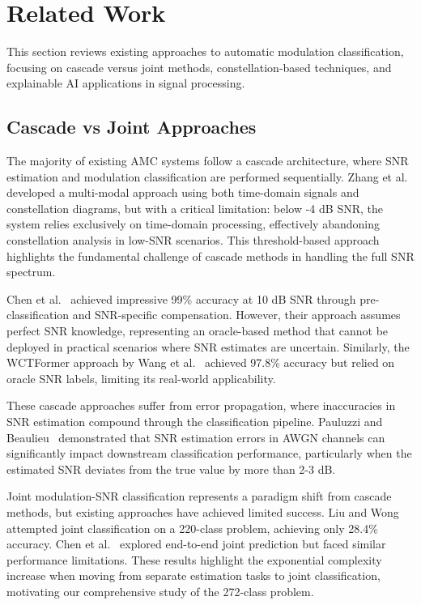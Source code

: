 \documentclass{ELSP}
\begin{document}
\section{Related Work}
\label{sec:related_work}

This section reviews existing approaches to automatic modulation classification, focusing on cascade versus joint methods, constellation-based techniques, and explainable AI applications in signal processing.

\subsection{Cascade vs Joint Approaches}

The majority of existing AMC systems follow a cascade architecture, where SNR estimation and modulation classification are performed sequentially. Zhang et al.~\cite{zhang2023multimodal} developed a multi-modal approach using both time-domain signals and constellation diagrams, but with a critical limitation: below -4 dB SNR, the system relies exclusively on time-domain processing, effectively abandoning constellation analysis in low-SNR scenarios. This threshold-based approach highlights the fundamental challenge of cascade methods in handling the full SNR spectrum.

Chen et al.~\cite{chen2024preclassification} achieved impressive 99\% accuracy at 10 dB SNR through pre-classification and SNR-specific compensation. However, their approach assumes perfect SNR knowledge, representing an oracle-based method that cannot be deployed in practical scenarios where SNR estimates are uncertain. Similarly, the WCTFormer approach by Wang et al.~\cite{wang2024wctformer} achieved 97.8\% accuracy but relied on oracle SNR labels, limiting its real-world applicability.

These cascade approaches suffer from error propagation, where inaccuracies in SNR estimation compound through the classification pipeline. Pauluzzi and Beaulieu~\cite{pauluzzi2000comparison} demonstrated that SNR estimation errors in AWGN channels can significantly impact downstream classification performance, particularly when the estimated SNR deviates from the true value by more than 2-3 dB.

Joint modulation-SNR classification represents a paradigm shift from cascade methods, but existing approaches have achieved limited success. Liu and Wong~\cite{liu2022jointsnr} attempted joint classification on a 220-class problem, achieving only 28.4\% accuracy. Chen et al.~\cite{chen2021endtoend} explored end-to-end joint prediction but faced similar performance limitations. These results highlight the exponential complexity increase when moving from separate estimation tasks to joint classification, motivating our comprehensive study of the 272-class problem.
\end{document}
